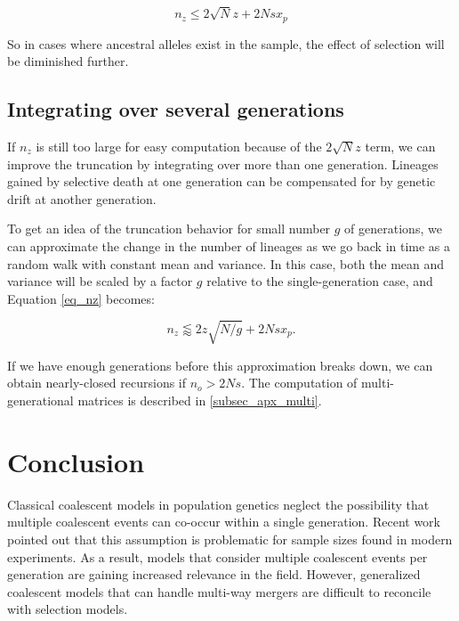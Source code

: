 \documentclass[review]{elsarticle}
\begin{document}
\begin{equation*}
  n_z \leq 2 \sqrt{N} z + 2Nsx_p
\end{equation*}

So in cases where ancestral alleles exist in the sample, the effect of selection will be
diminished further.

\subsection{Integrating over several generations} 

If $n_z$ is still too large for easy computation because of the $2 \sqrt{N} z$ term, we can improve 
the truncation by integrating over more than one generation.
Lineages gained by selective death at one generation can be compensated for by genetic drift at
another generation.

To get an idea of the truncation behavior for small number $g$ of generations, we can approximate 
the change  in the number of lineages as we go back in time as a random walk with constant mean and 
variance. In this case, both the mean and variance will be scaled by a factor $g$ relative 
to the single-generation case, and Equation \eqref{eq_nz} becomes:

\begin{equation}
  n_z \lessapprox 2 z\sqrt{N/g} + 2N s x_p.
\label{eq_nzg}
\end{equation}

If we have enough generations before this approximation breaks down, we can obtain nearly-closed
recursions if $n_o> 2Ns$. The computation of multi-generational matrices is described in
\ref{subsec_apx_multi}.

\section{Conclusion}
\label{sec_conclusion}


Classical coalescent models in population genetics neglect the possibility that multiple coalescent events 
can co-occur within a single generation. 
Recent work \citep{BhaskarEtAl2014,NelsonEtAl2019} pointed out that this
assumption is problematic for sample sizes found in modern experiments. As a result, models
that consider multiple coalescent events per generation are gaining increased relevance in the field.
However, generalized coalescent models that can handle multi-way mergers are difficult to reconcile 
with selection models.
\end{document}
